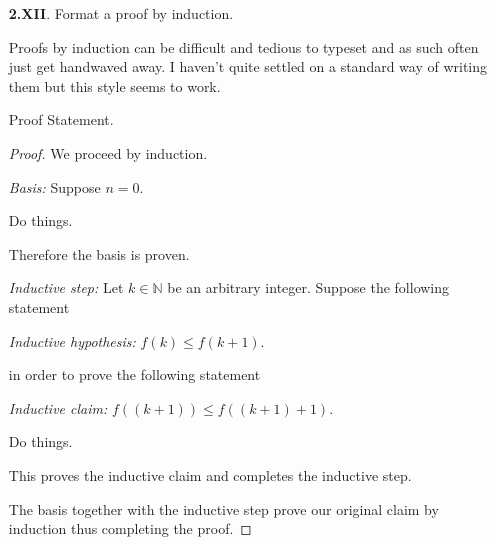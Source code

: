 \begin{enumerate}
\begin{proof}
          \textbf{Case 3:} ($x>0$)
          \begin{addmargin}{1cm}
            Suppose $x>0$.

            Do things.

            Thus $P$ is true.
          \end{addmargin}

          Since $P$ is true in each case then $P$ must always be true.
        \end{proof}

      \qspace

      \item[\textbf{2.XII}.]
        Format a proof by induction.

        \aspace

        Proofs by induction can be difficult and tedious to typeset and as such often just get handwaved away. I haven't quite settled on a standard way of writing them but this style seems to work.

        \begin{thm}
           Proof Statement.
        \end{thm}
        \begin{proof} We proceed by induction.

        \textit{Basis:} Suppose $n=0$.

        Do things.

        Therefore the basis is proven.

        \textit{Inductive step:} Let $k\in\mathbb{N}$ be an arbitrary integer. Suppose the following statement
        \begin{addmargin}{1cm}
          \textit{Inductive hypothesis:} $f(k)\leq f(k+1)$.
        \end{addmargin}
        in order to prove the following statement
        \begin{addmargin}{1cm}
          \textit{Inductive claim:} $f((k+1))\leq f((k+1)+1)$.
        \end{addmargin}

        Do things.

        This proves the inductive claim and completes the inductive step.

        The basis together with the inductive step prove our original claim by induction thus completing the proof.
        \end{proof}

      \qspace


\end{enumerate}
